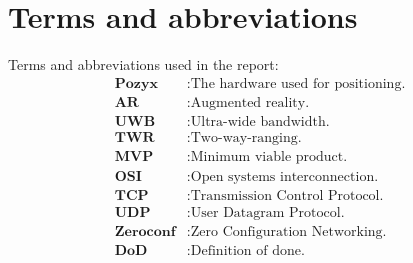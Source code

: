 \chapter*{Terms and abbreviations}
Terms and abbreviations used in the report:
\begin{align*}
    \textbf{Pozyx}    & : \text{The hardware used for positioning.} \\
    \textbf{AR}       & : \text{Augmented reality.}                 \\
    \textbf{UWB}      & : \text{Ultra-wide bandwidth.}              \\
    \textbf{TWR}      & : \text{Two-way-ranging.}                   \\
    \textbf{MVP}      & : \text{Minimum viable product.}            \\
    \textbf{OSI}      & : \text{Open systems interconnection.}      \\
    \textbf{TCP}      & : \text{Transmission Control Protocol.}     \\
    \textbf{UDP}      & : \text{User Datagram Protocol.}            \\
    \textbf{Zeroconf} & : \text{Zero Configuration Networking.}     \\
    \textbf{DoD}      & : \text{Definition of done.}                \\
\end{align*}